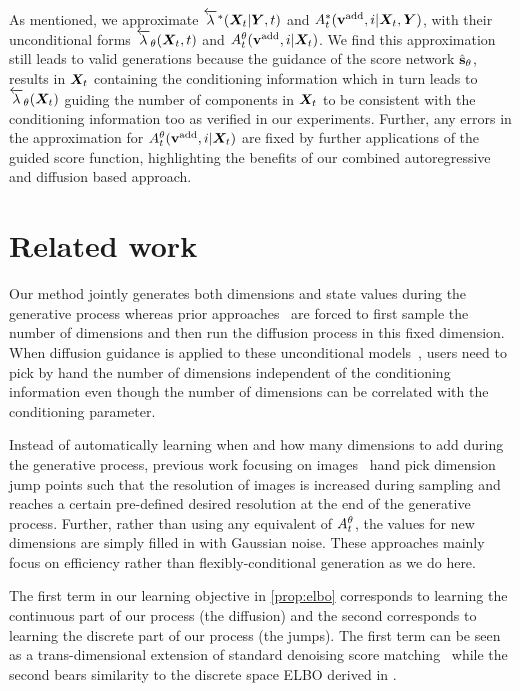 As mentioned, we approximate $\overleftarrow{\lambda}^*({\bm{X}}_t | {\bm{Y}}, t)$ and $A_t^*({\mathbf{v}}^{\textup{add}}, i | {\bm{X}}_t, {\bm{Y}})$, with their unconditional forms $\overleftarrow{\lambda}_\theta({\bm{X}}_t, t)$ and $A_t^\theta({\mathbf{v}}^{\textup{add}}, i | {\bm{X}}_t)$. We find this approximation still leads to valid generations because the guidance of the score network $\hat{{\mathbf{s}}}_\theta$, results in ${\bm{X}}_t$ containing the conditioning information which in turn leads to $\overleftarrow{\lambda}_\theta({\bm{X}}_t)$ guiding the number of components in ${\bm{X}}_t$ to be consistent with the conditioning information too as verified in our experiments. Further, any errors in the approximation for $A_t^\theta({\mathbf{v}}^{\textup{add}}, i | {\bm{X}}_t)$ are fixed by further applications of the guided score function, highlighting the benefits of our combined autoregressive and diffusion based approach.



\section{Related work}

Our method jointly generates both dimensions and state values during the generative process whereas prior approaches~\citep{hoogeboom2022equivariant, igashov2022equivariant} are forced to first sample the number of dimensions and then run the diffusion process in this fixed dimension. When diffusion guidance is applied to these unconditional models~\citep{weiss2023guided, zhang2023towards}, users need to pick by hand the number of dimensions independent of the conditioning information even though the number of dimensions can be correlated with the conditioning parameter.

Instead of automatically learning when and how many dimensions to add during the generative process, previous work focusing on images~\citep{jing2022subspace, zhang2022dimensionality} hand pick dimension jump points such that the resolution of images is increased during sampling and reaches a certain pre-defined desired resolution at the end of the generative process. Further, rather than using any equivalent of $A_t^\theta$, the values for new dimensions are simply filled in with Gaussian noise. These approaches mainly focus on efficiency rather than flexibly-conditional generation as we do here.

The first term in our learning objective in \cref{prop:elbo} corresponds to learning the continuous part of our process (the diffusion) and the second corresponds to learning the discrete part of our process (the jumps). The first term can be seen as a trans-dimensional extension of standard denoising score matching~\citep{vincent2011connection} while the second bears similarity to the discrete space ELBO derived in \citet{campbell2022continuous}.

